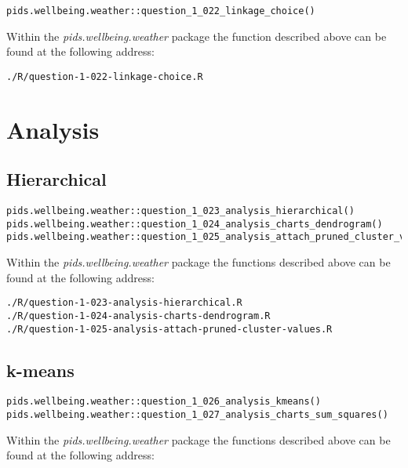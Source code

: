 \documentclass[12pt, oneside, openany]{book}
\begin{document}
\begin{verbatim}
pids.wellbeing.weather::question_1_022_linkage_choice()
\end{verbatim}

Within the \emph{pids.wellbeing.weather} package the function described above can be found at the following address:

\begin{verbatim}
./R/question-1-022-linkage-choice.R
\end{verbatim}

\section*{Analysis}

\subsection*{Hierarchical}

\begin{verbatim}
pids.wellbeing.weather::question_1_023_analysis_hierarchical()
pids.wellbeing.weather::question_1_024_analysis_charts_dendrogram()
pids.wellbeing.weather::question_1_025_analysis_attach_pruned_cluster_values()
\end{verbatim}

Within the \emph{pids.wellbeing.weather} package the functions described above can be found at the following address:

\begin{verbatim}
./R/question-1-023-analysis-hierarchical.R
./R/question-1-024-analysis-charts-dendrogram.R
./R/question-1-025-analysis-attach-pruned-cluster-values.R
\end{verbatim}

\subsection*{k-means}

\begin{verbatim}
pids.wellbeing.weather::question_1_026_analysis_kmeans()
pids.wellbeing.weather::question_1_027_analysis_charts_sum_squares()
\end{verbatim}

Within the \emph{pids.wellbeing.weather} package the functions described above can be found at the following address:
\end{document}

